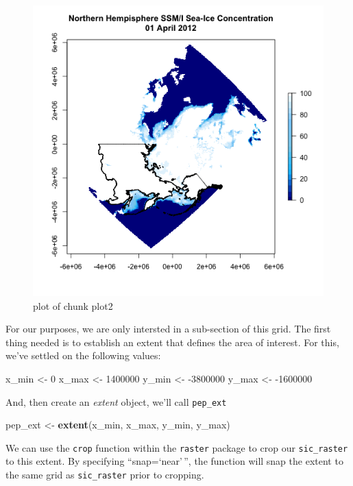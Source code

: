 \documentclass[]{article}
\makeatletter
\newenvironment{Shaded}{}{}
\newcommand{\KeywordTok}[1]{\textcolor[rgb]{0.00,0.44,0.13}{\textbf{{#1}}}}
\newcommand{\DecValTok}[1]{\textcolor[rgb]{0.25,0.63,0.44}{{#1}}}
\newcommand{\NormalTok}[1]{{#1}}
\def\maxwidth{\ifdim\Gin@nat@width>\linewidth\linewidth
\else\Gin@nat@width\fi}
\let\Oldincludegraphics\includegraphics
\renewcommand{\includegraphics}[1]{\Oldincludegraphics[width=\maxwidth]{#1}}
\makeatother
\begin{document}
\begin{figure}[htbp]
\centering
\includegraphics{figure/plot2.png}
\caption{plot of chunk plot2}
\end{figure}

For our purposes, we are only intersted in a sub-section of this grid.
The first thing needed is to establish an extent that defines the area
of interest. For this, we've settled on the following values:

\begin{Shaded}
\begin{Highlighting}[]
\NormalTok{x_min <- }\DecValTok{0}
\NormalTok{x_max <- }\DecValTok{1400000}
\NormalTok{y_min <- -}\DecValTok{3800000}
\NormalTok{y_max <- -}\DecValTok{1600000}
\end{Highlighting}
\end{Shaded}
And, then create an \emph{extent} object, we'll call \texttt{pep\_ext}

\begin{Shaded}
\begin{Highlighting}[]
\NormalTok{pep_ext <- }\KeywordTok{extent}\NormalTok{(x_min, x_max, y_min, y_max)}
\end{Highlighting}
\end{Shaded}
We can use the \texttt{crop} function within the \texttt{raster} package
to crop our \texttt{sic\_raster} to this extent. By specifying
``snap=`near'\,'', the function will snap the extent to the same grid as
\texttt{sic\_raster} prior to cropping.
\end{document}
